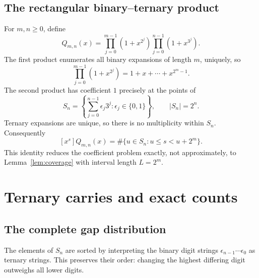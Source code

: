 \documentclass[11pt,letterpaper]{article}
\numberwithin{equation}{section}
\theoremstyle{definition}
\theoremstyle{remark}
\begin{document}
\subsection{The rectangular binary--ternary product}
For $m,n\ge0$, define
\begin{equation}\label{eq:rectangle}
 Q_{m,n}(x)=
 \prod_{j=0}^{m-1}(1+x^{2^j})
 \prod_{j=0}^{n-1}(1+x^{3^j}).
\end{equation}
The first product enumerates all binary expansions of length $m$, uniquely,
so
\begin{equation}\label{eq:densefactor}
 \prod_{j=0}^{m-1}(1+x^{2^j})=1+x+\cdots+x^{2^m-1}.
\end{equation}
The second product has coefficient $1$ precisely at the points of
\begin{equation}\label{eq:ternarysupport}
 S_n=\left\{\sum_{j=0}^{n-1}\epsilon_j3^j:
             \epsilon_j\in\{0,1\}\right\},
 \qquad |S_n|=2^n.
\end{equation}
Ternary expansions are unique, so there is no multiplicity within $S_n$.
Consequently
\begin{equation}\label{eq:coverageinterpretation}
 [x^s]Q_{m,n}(x)=\#\{u\in S_n:u\le s<u+2^m\}.
\end{equation}
This identity reduces the coefficient problem exactly, not approximately,
to Lemma~\ref{lem:coverage} with interval length $L=2^m$.

\section{Ternary carries and exact counts}\label{sec:exact}

\subsection{The complete gap distribution}
The elements of $S_n$ are sorted by interpreting the binary digit strings
$\epsilon_{n-1}\cdots\epsilon_0$ as ternary strings. This preserves their
order: changing the highest differing digit outweighs all lower digits.
\end{document}
